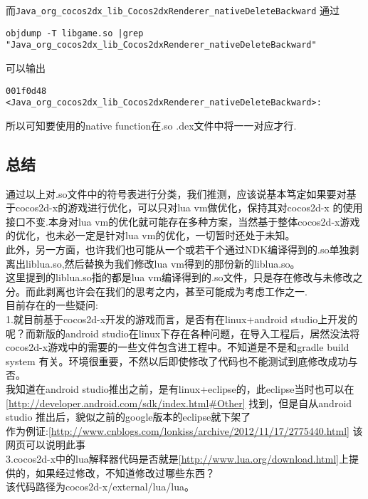 而\verb|Java_org_cocos2dx_lib_Cocos2dxRenderer_nativeDeleteBackward|
通过\\
\begin{lstlisting}
objdump -T libgame.so |grep "Java_org_cocos2dx_lib_Cocos2dxRenderer_nativeDeleteBackward"
\end{lstlisting}

可以输出
\begin{lstlisting}
001f0d48 <Java_org_cocos2dx_lib_Cocos2dxRenderer_nativeDeleteBackward>:
\end{lstlisting}
所以可知要使用的native function在.so .dex文件中将一一对应才行.\\


\subsection{总结}
通过以上对.so文件中的符号表进行分类，我们推测，应该说基本笃定如果要对基于cocos2d-x的游戏进行优化，可以只对lua vm做优化，保持其对cocos2d-x
的使用接口不变.本身对lua vm的优化就可能存在多种方案，当然基于整体cocos2d-x游戏的优化，也未必一定是针对lua vm的优化，一切暂时还处于未知。\\

此外，另一方面，也许我们也可能从一个或若干个通过NDK编译得到的.so单独剥离出liblua.so,然后替换为我们修改lua vm得到的那份新的liblua.so。\\
这里提到的liblua.so指的都是lua vm编译得到的.so文件，只是存在修改与未修改之分。而此剥离也许会在我们的思考之内，甚至可能成为考虑工作之一.\\

目前存在的一些疑问:\\
1.就目前基于cocos2d-x开发的游戏而言，是否有在linux+android studio上开发的呢？而新版的android studio在linux下存在各种问题，在导入工程后，居然没法将cocos2d-x游戏中的需要的一些文件包含进工程中。不知道是不是和gradle build system 有关。环境很重要，不然以后即使修改了代码也不能测试到底修改成功与否。\\
    我知道在android studio推出之前，是有linux+eclipse的，此eclipse当时也可以在\ref{http://developer.android.com/sdk/index.html#Other} 找到，但是自从android studio 推出后，貌似之前的google版本的eclipse就下架了\\
作为例证:\ref{http://www.cnblogs.com/lonkiss/archive/2012/11/17/2775440.html} 该网页可以说明此事\\


3.cocos2d-x中的lua解释器代码是否就是\ref{http://www.lua.org/download.html}上提供的，如果经过修改，不知道修改过哪些东西？\\
该代码路径为cocos2d-x/external/lua/lua。













